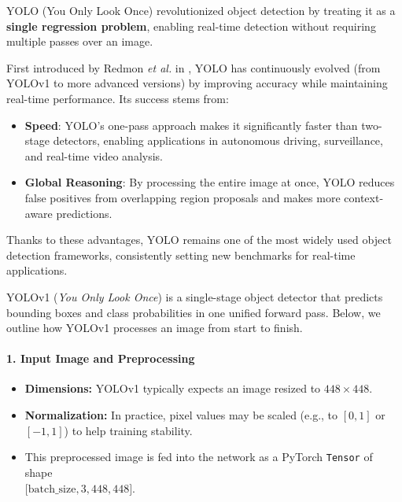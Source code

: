 \begin{enrichment}
\begin{enrichment}[Background][subsection]
    YOLO (You Only Look Once) revolutionized object detection by treating it as a \textbf{single regression problem}, enabling real-time detection without requiring multiple passes over an image. 
    
    First introduced by Redmon \textit{et al.} in \cite{redmon2016_yolo}, YOLO has continuously evolved (from YOLOv1 to more advanced versions) by improving accuracy while maintaining real-time performance. Its success stems from:
    \begin{itemize}
        \item \textbf{Speed}: YOLO's one-pass approach makes it significantly faster than two-stage detectors, enabling applications in autonomous driving, surveillance, and real-time video analysis.
        \item \textbf{Global Reasoning}: By processing the entire image at once, YOLO reduces false positives from overlapping region proposals and makes more context-aware predictions.
    \end{itemize}
    Thanks to these advantages, YOLO remains one of the most widely used object detection frameworks, consistently setting new benchmarks for real-time applications.
\end{enrichment}
    
\begin{enrichment}
    YOLOv1 (\textit{You Only Look Once}) is a single-stage object detector that predicts bounding boxes and class probabilities in one unified forward pass. Below, we outline how YOLOv1 processes an image from start to finish.
    
    \paragraph{1. Input Image and Preprocessing}
    \begin{itemize}
        \item \textbf{Dimensions:} YOLOv1 typically expects an image resized to \(448\times448\).
        \item \textbf{Normalization:} In practice, pixel values may be scaled (e.g., to \([0,1]\) or \([-1,1]\)) to help training stability.
        \item This preprocessed image is fed into the network as a PyTorch \texttt{Tensor} of shape \\ \(\bigl[\text{batch\_size}, 3, 448, 448\bigr]\).
    \end{itemize}
    

\end{enrichment}
\end{enrichment}
